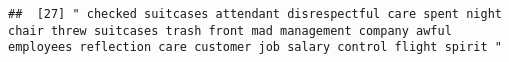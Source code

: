 \documentclass[
]{article}
\begin{document}
\begin{verbatim}
##  [27] " checked suitcases attendant disrespectful care spent night chair threw suitcases trash front mad management company awful employees reflection care customer job salary control flight spirit "                                                                                                                                                                                                                                                                                                                                                                                                                                                                                                                                                                                                                                                                                                                                                                                                                                                                                                                                                                                                                                                                                                                                                                                                                                                                                                                                                                                                                                                                                                                                                                                               

\end{verbatim}
\end{document}
